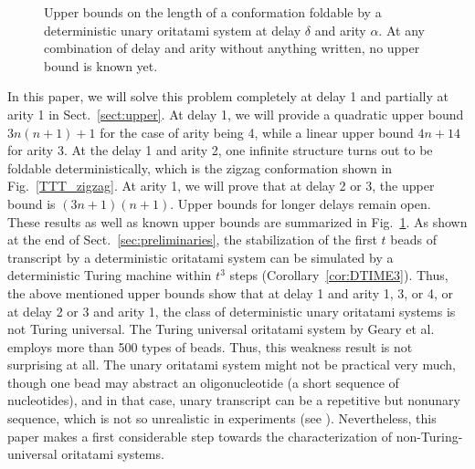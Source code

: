 \documentclass[runningheads]{llncs}
\begin{document}
\begin{figure}[tb]
\centering
{}
\caption{Upper bounds on the length of a conformation foldable by a deterministic unary oritatami system at delay $\delta$ and arity $\alpha$.
At any combination of delay and arity without anything written, no upper bound is known yet.
}
\label{fig:summary}
\end{figure}
In this paper, we will solve this problem  completely at delay 1 and partially at arity 1 in Sect.~\ref{sect:upper}. 
At delay 1, we will provide a quadratic upper bound $3n(n+1)+1$ for the case of arity being 4, while a linear upper bound $4n+14$ for arity 3. 
At the delay 1 and arity 2, one infinite structure turns out to be foldable deterministically, which is the zigzag conformation shown in Fig.~\ref{TTT_zigzag}. 
At arity 1, we will prove that at delay 2 or 3, the upper bound is $(3n+1)(n+1)$. 
Upper bounds for longer delays remain open. These results as well as known upper bounds are summarized in Fig.~\ref{fig:summary}. 
As shown at the end of Sect.~\ref{sec:preliminaries}, the stabilization of the first $t$ beads of transcript by a deterministic oritatami system can be simulated by a deterministic Turing machine within $t^3$ steps (Corollary~\ref{cor:DTIME3}). 
Thus, the above mentioned upper bounds show that at delay 1 and arity 1, 3, or 4, or at delay 2 or 3 and arity 1, the class of deterministic unary oritatami systems is not Turing universal. 
The Turing universal oritatami system by Geary et al. \cite{GeMeScSe2018} employs more than 500 types of beads. 
Thus, this weakness result is not surprising at all. 
The unary oritatami system might not be practical very much, though one bead may abstract an oligonucleotide (a short sequence of nucleotides), and in that case, unary transcript can be a repetitive but nonunary sequence, which is not so unrealistic in experiments (see \cite{GearyAndersen2014}). 
Nevertheless, this paper makes a first considerable step towards the characterization of non-Turing-universal oritatami systems. 
\end{document}
